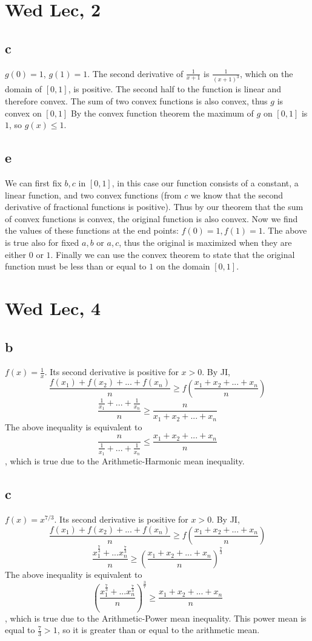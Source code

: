 \documentclass[12pt]{article}
\begin{document}
\newpage

\section{Wed Lec, 2}
\subsection{c}
$g(0)=1$, $g(1) = 1$. The second derivative of $\frac{1}{x+1}$ is $\frac{1}{(x+1)^3}$, which on the domain of $[0,1]$, is positive. The second half to the function is linear and therefore convex. The sum of two convex functions is also convex, thus $g$ is convex on $[0,1]$
\newline
By the convex function theorem the maximum of $g$ on $[0,1]$ is $1$, so $g(x)\leq 1$.

\subsection{e}
We can first fix $b, c$ in $[0,1]$, in this case our function consists of a constant, a linear function, and two convex functions (from $c$ we know that the second derivative of fractional functions is positive).
Thus by our theorem that the sum of convex functions is convex, the original function is also convex.
\newline
Now we find the values of these functions at the end points: $f(0) = 1, f(1) = 1$. The above is true also for fixed $a,b$ or $a,c$, thus the original is maximized when they are either $0$ or $1$. Finally we can use the convex theorem to state that the original function must be less than or equal to $1$ on the domain $[0,1]$.


\section{Wed Lec, 4}
\subsection{b}
$f(x) = \frac{1}{x}$. Its second derivative is positive for $x>0$. By JI,
$$\frac{f(x_1)+f(x_2)+...+f(x_n)}{n} \geq f(\frac{x_1+x_2+...+x_n}{n})$$
$$\frac{\frac{1}{x_1}+...+\frac{1}{x_n}}{n} \geq \frac{n}{x_1+x_2+...+x_n}$$
The above inequality is equivalent to
$$\frac{n}{\frac{1}{x_1}+...+\frac{1}{x_n}} \leq \frac{x_1+x_2+...+x_n}{n}$$
, which is true due to the Arithmetic-Harmonic mean inequality.

\subsection{c}
$f(x) = x^{7/3}$. Its second derivative is positive for $x>0$. By JI,
$$\frac{f(x_1)+f(x_2)+...+f(x_n)}{n} \geq f(\frac{x_1+x_2+...+x_n}{n})$$
$$\frac{x_1^{\frac{7}{3}} + ... x_n^{\frac{7}{3}}}{n} \geq (\frac{x_1+x_2+...+x_n}{n})^{\frac{7}{3}}$$
The above inequality is equivalent to
$$(\frac{x_1^{\frac{7}{3}} + ... x_n^{\frac{7}{3}}}{n})^{\frac{3}{7}}\geq \frac{x_1+x_2+...+x_n}{n}$$
, which is true due to the Arithmetic-Power mean inequality. This power mean is equal to $\frac{7}{3} > 1$, so it is greater than or equal to the arithmetic mean.
\end{document}
